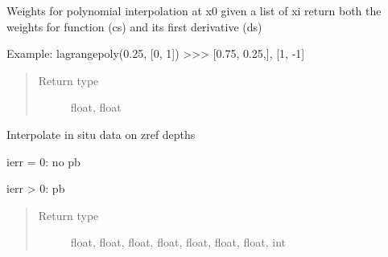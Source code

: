 \documentclass[letterpaper,10pt,english]{sphinxmanual}
\begin{document}

\begin{fulllineitems}
\label{\detokenize{pargopy:pargopy.interpolation_tools.lagrangepoly}}
Weights for polynomial interpolation at x0 given a list of xi
return both the weights for function (cs) and its first derivative
(ds)

Example:
lagrangepoly(0.25, {[}0, 1{]})
\textgreater{}\textgreater{}\textgreater{} {[}0.75, 0.25,{]}, {[}1, -1{]}
\begin{quote}\begin{description}
\item[{Return type}] \leavevmode
float, float

\end{description}\end{quote}

\end{fulllineitems}


\begin{fulllineitems}
\label{\detokenize{pargopy:pargopy.interpolation_tools.raw_to_interpolate}}
Interpolate in situ data on zref depths

ierr = 0: no pb

ierr \textgreater{} 0: pb
\begin{quote}\begin{description}
\item[{Return type}] \leavevmode
float, float, float, float, float, float, float, int

\end{description}\end{quote}

\end{fulllineitems}

\end{document}
